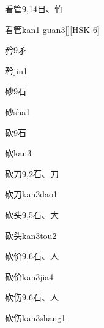 \begin{Entry}{看管}{9,14}{⽬、⽵}
  \begin{Phonetics}{看管}{kan1 guan3}[][HSK 6]
  \end{Phonetics}
\end{Entry}

\begin{Entry}{矜}{9}{⽭}
  \begin{Phonetics}{矜}{jin1}
  \end{Phonetics}
\end{Entry}

\begin{Entry}{砂}{9}{⽯}
  \begin{Phonetics}{砂}{sha1}
  \end{Phonetics}
\end{Entry}

\begin{Entry}{砍}{9}{⽯}
  \begin{Phonetics}{砍}{kan3}
  \end{Phonetics}
\end{Entry}

\begin{Entry}{砍刀}{9,2}{⽯、⼑}
  \begin{Phonetics}{砍刀}{kan3dao1}
  \end{Phonetics}
\end{Entry}

\begin{Entry}{砍头}{9,5}{⽯、⼤}
  \begin{Phonetics}{砍头}{kan3tou2}
  \end{Phonetics}
\end{Entry}

\begin{Entry}{砍价}{9,6}{⽯、⼈}
  \begin{Phonetics}{砍价}{kan3jia4}
  \end{Phonetics}
\end{Entry}

\begin{Entry}{砍伤}{9,6}{⽯、⼈}
  \begin{Phonetics}{砍伤}{kan3shang1}
  \end{Phonetics}
\end{Entry}

